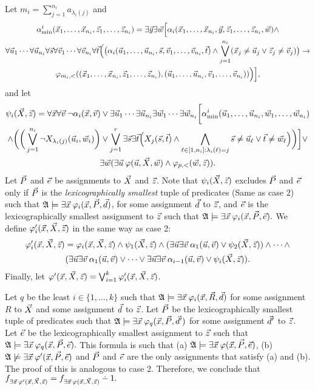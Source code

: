 Let $m_i = \sum_{j = 1}^{n_i} a_{\lambda_i(j)}$ and
\begin{multline*}
\alpha^i_{\min}(\x_1,\dots,\x_{n_i},\z_1,\dots,\z_{n_i}) = \exists\y\exists\w\Big[ \alpha_i(\x_1,\dots,\x_{n_i},\y,\z_1,\dots,\z_{n_i},\w)\wedge \\ \forall\u_1\cdots\forall\u_{n_i}\forall\s\forall\v_1\cdots\forall\v_{n_i}\forall\t\Big(\big(\alpha_i(\u_1,\dots,\u_{n_i},\s,\v_1,\dots,\v_{n_i},\t)\wedge\bigvee_{j=1}^{n_i}(\x_j\neq\u_j \vee \z_j\neq\v_j)\big)\to \\ \varphi_{m_i,<}((\x_1,\dots,\x_{n_i},\z_1,\dots,\z_{n_i}),(\u_1,\dots,\u_{n_i},\v_1,\dots,\v_{n_i}))\Big)\Big],
\end{multline*}
and let
\begin{multline*}
\psi_i(\X,\z) = \forall\x\forall\v\:\neg\alpha_i(\x,\v) \vee \exists\u_1\cdots\exists\u_{n_i}\exists\w_1\cdots\exists\w_{n_i}\bigg[\alpha^i_{\min}(\u_1,\dots,\u_{n_i},\w_1,\dots,\w_{n_i}) \\ \wedge \bigg(\bigg(\bigvee_{j = 1}^{n_i}\neg X_{\lambda_i(j)}(\u_i,\w_i) \bigg) \vee \bigvee_{j=1}^r \exists \s\exists \t\Big( X_j(\s,\t) \wedge \bigwedge_{\ell\in[1,n_i]: \lambda_i(\ell) = j} \s \neq \u_\ell \vee \t \neq \w_\ell\Big) \bigg) \bigg] \vee \\ \exists\w(\exists\u\:\varphi(\u,\X,\w) \wedge \varphi_{p,<}(\w,\z)).
\end{multline*}
Let $\P$ and $\e$ be assignments to $\X$ and $\z$. Note that $\psi_i(\X,\z)$ excludes $\P$ and $\e$ only if $\P$ is the {\em lexicographically smallest} tuple of predicates (Same as case 2) such that $\A\models\exists\x\:\varphi_i(\x,\P,\d)$, for some assignment $\d$ to $\z$, and $\e$ is the lexicographically smallest assignment to $\z$ such that $\A\models\exists\x\:\varphi_i(\x,\P,\e).$ We define $\varphi_i^\prime(\x,\X,\z)$ in the same way as case 2:
\begin{multline*}
\varphi_i^\prime(\x,\X,\z) = \varphi_i(\x,\X,\z) \wedge \psi_1(\X,\z) \wedge (\exists\u\exists\v\:\alpha_1(\u,\v)\vee\psi_2(\X,\z)) \wedge \cdots \wedge \\ (\exists\u\exists\v\:\alpha_1(\u,\v)\vee\cdots\vee\exists\u\exists\v\:\alpha_{i-1}(\u,\v)\vee\psi_i(\X,\z)).
\end{multline*}
Finally, let $\varphi^\prime(\x,\X,\z) = \bigvee_{i = 1}^k \varphi_i^\prime(\x,\X,\z)$.

Let $q$ be the least $i\in\{1,\ldots,k\}$ such that $\A\models\exists\x\:\varphi_i(\x,\R,\d)$ for some assignment $R$ to $\X$ and some assignment $\d$ to $\z$. Let $\P$ be the lexicographically smallest tuple of predicates such that $\A\models\exists\x\:\varphi_q(\x,\P,\d^\prime)$ for some assignment $\d^\prime$ to $\z$. Let $\e$ be the lexicographically smallest assignment to $\z$ such that $\A\models\exists\x\:\varphi_q(\x,\P,\e).$ This formula is such that (a) $\A\models\exists\x\:\varphi(\x,\P,\e)$, (b) $\A\not\models\exists\x\:\varphi^\prime(\x,\P,\e)$ and $\P$ and $\e$ are the only assignments that satisfy (a) and (b). The proof of this is analogous to case 2. Therefore, we conclude that $f_{\exists\x\,\varphi^\prime(\x,\X,\z)} = f_{\exists\x\,\varphi(\x,\X,\z)}\dotminus 1.$